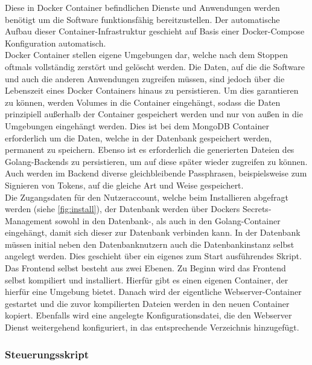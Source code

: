\newpage

Diese in Docker Container befindlichen Dienste und Anwendungen werden benötigt um die Software funktionsfähig bereitzustellen. Der automatische Aufbau dieser Container-Infrastruktur geschieht auf Basis einer Docker-Compose Konfiguration automatisch. \\

Docker Container stellen eigene Umgebungen dar, welche nach dem Stoppen oftmals vollständig zerstört und gelöscht werden. Die Daten, auf die die Software und auch die anderen Anwendungen zugreifen müssen, sind jedoch über die Lebenszeit eines Docker Containers hinaus zu persistieren. Um dies garantieren zu können, werden Volumes in die Container eingehängt, sodass die Daten prinzipiell außerhalb der Container gespeichert werden und nur von außen in die Umgebungen eingehängt werden. Dies ist bei dem MongoDB Container erforderlich um die Daten, welche in der Datenbank gespeichert werden, permanent zu speichern. Ebenso ist es erforderlich die generierten Dateien des Golang-Backends zu persistieren, um auf diese später wieder zugreifen zu können. Auch werden im Backend diverse gleichbleibende Passphrasen, beispielsweise zum Signieren von Tokens, auf die gleiche Art und Weise gespeichert. \\

Die Zugangsdaten für den Nutzeraccount, welche beim Installieren abgefragt werden (siehe \autoref{fig:install}), der Datenbank werden über Dockers Secrets-Management sowohl in den Datenbank-, als auch in den Golang-Container eingehängt, damit sich dieser zur Datenbank verbinden kann. In der Datenbank müssen initial neben den Datenbanknutzern auch die Datenbankinstanz selbst angelegt werden. Dies geschieht über ein eigenes zum Start ausführendes Skript. \\

Das Frontend selbst besteht aus zwei Ebenen. Zu Beginn wird das Frontend selbst kompiliert und installiert. Hierfür gibt es einen eigenen Container, der hierfür eine Umgebung bietet. Danach wird der eigentliche Webserver-Container gestartet und die zuvor kompilierten Dateien werden in den neuen Container kopiert. Ebenfalls wird eine angelegte Konfigurationsdatei, die den Webserver Dienst weitergehend konfiguriert, in das entsprechende Verzeichnis hinzugefügt.\\

\newpage

\subsubsection{Steuerungsskript}

